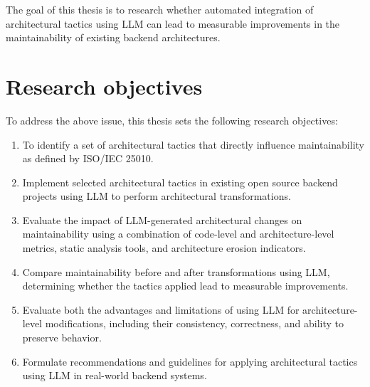 The goal of this thesis is to research whether automated integration of architectural tactics using LLM can lead to measurable improvements in the maintainability of existing backend architectures.

\section{Research objectives}

To address the above issue, this thesis sets the following research objectives:
\begin{enumerate}
    \item To identify a set of architectural tactics that directly influence maintainability as defined by ISO/IEC 25010.

    \item Implement selected architectural tactics in existing open source backend projects using LLM to perform architectural transformations.

    \item Evaluate the impact of LLM-generated architectural changes on maintainability using a combination of code-level and architecture-level metrics, static analysis tools, and architecture erosion indicators.

    \item Compare maintainability before and after transformations using LLM, determining whether the tactics applied lead to measurable improvements.

    \item Evaluate both the advantages and limitations of using LLM for architecture-level modifications, including their consistency, correctness, and ability to preserve behavior.

    \item Formulate recommendations and guidelines for applying architectural tactics using LLM in real-world backend systems.
\end{enumerate}
